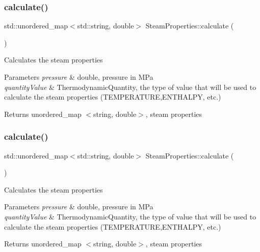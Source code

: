 \subsubsection{\texorpdfstring{calculate()}{calculate()}\hspace{0.1cm}{\footnotesize\ttfamily [2/3]}}
{\footnotesize\ttfamily std\+::unordered\+\_\+map$<$std\+::string, double$>$ Steam\+Properties\+::calculate (\begin{DoxyParamCaption}{ }\end{DoxyParamCaption})}

Calculates the steam properties


\begin{DoxyParams}{Parameters}
{\em pressure} & double, pressure in M\+Pa \\
\hline
{\em quantity\+Value} & Thermodynamic\+Quantity, the type of value that will be used to calculate the steam properties (T\+E\+M\+P\+E\+R\+A\+T\+U\+RE,E\+N\+T\+H\+A\+L\+PY, etc.)\\
\hline
\end{DoxyParams}
\begin{DoxyReturn}{Returns}
unordered\+\_\+map $<$string, double$>$, steam properties 
\end{DoxyReturn}
\mbox{\label{class_steam_properties_a25dc635f2d8f24e0aa483ab86e5f10f0}} 
\subsubsection{\texorpdfstring{calculate()}{calculate()}\hspace{0.1cm}{\footnotesize\ttfamily [3/3]}}
{\footnotesize\ttfamily std\+::unordered\+\_\+map$<$std\+::string, double$>$ Steam\+Properties\+::calculate (\begin{DoxyParamCaption}{ }\end{DoxyParamCaption})}

Calculates the steam properties


\begin{DoxyParams}{Parameters}
{\em pressure} & double, pressure in M\+Pa \\
\hline
{\em quantity\+Value} & Thermodynamic\+Quantity, the type of value that will be used to calculate the steam properties (T\+E\+M\+P\+E\+R\+A\+T\+U\+RE,E\+N\+T\+H\+A\+L\+PY, etc.)\\
\hline
\end{DoxyParams}
\begin{DoxyReturn}{Returns}
unordered\+\_\+map $<$string, double$>$, steam properties 
\end{DoxyReturn}


